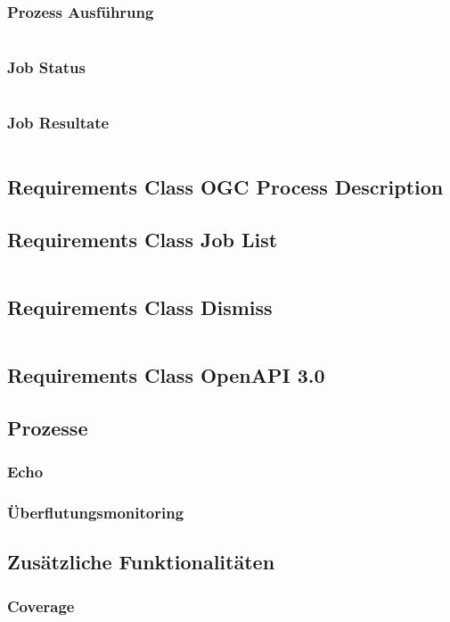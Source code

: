 \subsubsection{Prozess Ausführung}
\begin{lstlisting}[caption={Process Execution}, style = Python]
\end{lstlisting}  
\subsubsection{Job Status}
\begin{lstlisting}[caption={Job Status}, style = Python]
\end{lstlisting}  
\subsubsection{Job Resultate}
\begin{lstlisting}[caption={Job Results}, style = Python]
\end{lstlisting}  
\subsection{Requirements Class OGC Process Description}
\subsection{Requirements Class Job List}
\begin{lstlisting}[caption={Job List}, style = Python]
\end{lstlisting}  
\subsection{Requirements Class Dismiss}
\begin{lstlisting}[caption={Dismiss}, style = Python]
\end{lstlisting}  
\subsection{Requirements Class OpenAPI 3.0}
\subsection{Prozesse}
\subsubsection{Echo}
\subsubsection{Überflutungsmonitoring}
\subsection{Zusätzliche Funktionalitäten}
\subsubsection{Coverage}
\begin{lstlisting}[caption={Coverage}, style = Python]
\end{lstlisting}  